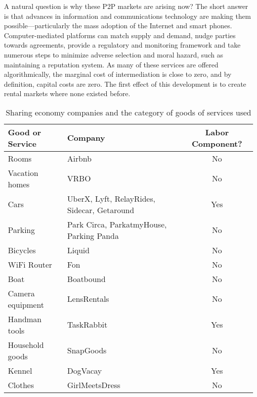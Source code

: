 \documentclass[11pt]{article}
\begin{document}
A natural question is why these P2P markets are arising now? 
The short answer is that advances in information and communications technology are making them possible---particularly the mass adoption of the Internet and smart phones.  
Computer-mediated platforms can match supply and demand, nudge parties towards agreements, provide a regulatory and monitoring framework and take numerous steps to minimize adverse selection and moral hazard, such as maintaining a reputation system. 
As many of these services are offered algorithmically, the marginal cost of intermediation is close to zero, and by definition, capital costs are zero.  
The first effect of this development is to create rental markets where none existed before. 

\begin{table}
\caption{Sharing economy companies and the category of goods of services used}
\centering
\begin{tabular}{llc} 
\toprule
Good or Service & Company & Labor Component? \\ 
\hline Rooms           & Airbnb & No \\ 
Vacation homes  & VRBO   & No \\ 
Cars            & UberX, Lyft, RelayRides, Sidecar, Getaround & Yes \\   
Parking         & Park Circa, ParkatmyHouse, Parking Panda & No \\
Bicycles        & Liquid & No \\   
WiFi Router     & Fon & No \\ 
Boat            & Boatbound & No \\
Camera equipment& LensRentals & No \\  
Handman tools   & TaskRabbit  & Yes \\
Household goods & SnapGoods   & No \\ 
Kennel          & DogVacay   & Yes \\ 
Clothes         & GirlMeetsDress & No \\
\bottomrule
\end{tabular}  
\end{table}
\end{document}
